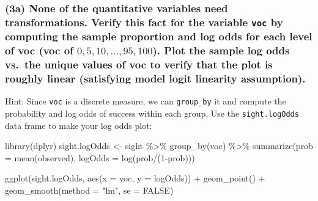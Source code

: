 \documentclass[
]{article}
\newenvironment{Shaded}{\begin{snugshade}}{\end{snugshade}}
\newcommand{\AttributeTok}[1]{\textcolor[rgb]{0.77,0.63,0.00}{#1}}
\newcommand{\ConstantTok}[1]{\textcolor[rgb]{0.00,0.00,0.00}{#1}}
\newcommand{\DecValTok}[1]{\textcolor[rgb]{0.00,0.00,0.81}{#1}}
\newcommand{\FunctionTok}[1]{\textcolor[rgb]{0.00,0.00,0.00}{#1}}
\newcommand{\NormalTok}[1]{#1}
\newcommand{\OtherTok}[1]{\textcolor[rgb]{0.56,0.35,0.01}{#1}}
\newcommand{\SpecialCharTok}[1]{\textcolor[rgb]{0.00,0.00,0.00}{#1}}
\newcommand{\StringTok}[1]{\textcolor[rgb]{0.31,0.60,0.02}{#1}}
\begin{document}
\hypertarget{a-none-of-the-quantitative-variables-need-transformations.-verify-this-fact-for-the-variable-voc-by-computing-the-sample-proportion-and-log-odds-for-each-level-of-voc-voc-of-0-5-10-dotsc-95-100.-plot-the-sample-log-odds-vs.-the-unique-values-of-voc-to-verify-that-the-plot-is-roughly-linear-satisfying-model-logit-linearity-assumption.}{%
\subsubsection{\texorpdfstring{(3a) None of the quantitative variables
need transformations. Verify this fact for the variable \texttt{voc} by
computing the sample proportion and log odds for each level of voc (voc
of \(0, 5, 10, \dotsc, 95, 100\)). Plot the sample log odds vs.~the
unique values of voc to verify that the plot is roughly linear
(satisfying model logit linearity
assumption).}{(3a) None of the quantitative variables need transformations. Verify this fact for the variable voc by computing the sample proportion and log odds for each level of voc (voc of 0, 5, 10, \textbackslash dotsc, 95, 100). Plot the sample log odds vs.~the unique values of voc to verify that the plot is roughly linear (satisfying model logit linearity assumption).}}\label{a-none-of-the-quantitative-variables-need-transformations.-verify-this-fact-for-the-variable-voc-by-computing-the-sample-proportion-and-log-odds-for-each-level-of-voc-voc-of-0-5-10-dotsc-95-100.-plot-the-sample-log-odds-vs.-the-unique-values-of-voc-to-verify-that-the-plot-is-roughly-linear-satisfying-model-logit-linearity-assumption.}}

Hint: Since \texttt{voc} is a discrete measure, we can
\texttt{group\_by} it and compute the probability and log odds of
success within each group. Use the \texttt{sight.logOdds} data frame to
make your log odds plot:

\begin{Shaded}
\begin{Highlighting}[]
\FunctionTok{library}\NormalTok{(dplyr)}
\NormalTok{sight.logOdds }\OtherTok{\textless{}{-}}\NormalTok{ sight }\SpecialCharTok{\%\textgreater{}\%}
  \FunctionTok{group\_by}\NormalTok{(voc) }\SpecialCharTok{\%\textgreater{}\%} 
  \FunctionTok{summarize}\NormalTok{(}\AttributeTok{prob =} \FunctionTok{mean}\NormalTok{(observed), }\AttributeTok{logOdds =} \FunctionTok{log}\NormalTok{(prob}\SpecialCharTok{/}\NormalTok{(}\DecValTok{1}\SpecialCharTok{{-}}\NormalTok{prob)))}

\FunctionTok{ggplot}\NormalTok{(sight.logOdds, }\FunctionTok{aes}\NormalTok{(}\AttributeTok{x =}\NormalTok{ voc, }\AttributeTok{y =}\NormalTok{ logOdds)) }\SpecialCharTok{+} \FunctionTok{geom\_point}\NormalTok{() }\SpecialCharTok{+} \FunctionTok{geom\_smooth}\NormalTok{(}\AttributeTok{method =} \StringTok{"lm"}\NormalTok{, }\AttributeTok{se =} \ConstantTok{FALSE}\NormalTok{)}
\end{Highlighting}
\end{Shaded}
\end{document}
